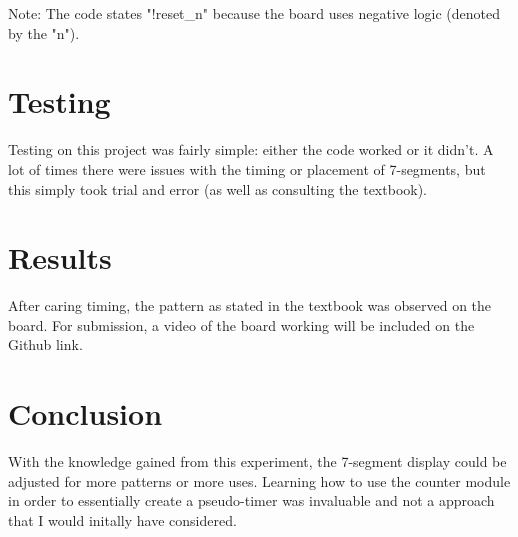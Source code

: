 \documentclass[11pt]{article}
\begin{document}
Note: The code states "!reset\_n" because the board uses negative logic (denoted by the "n"). 

\section*{Testing}

Testing on this project was fairly simple: either the code worked or it didn't. A lot of times there were issues with the timing or placement of 7-segments, but this simply took trial and error (as well as consulting the textbook). 

\section*{Results}

After caring timing, the pattern as stated in the textbook was observed on the board. For submission, a video of the board working will be included on the Github link. 

\section*{Conclusion}

With the knowledge gained from this experiment, the 7-segment display could be adjusted for more patterns or more uses. Learning how to use the counter module in order to essentially create a pseudo-timer was invaluable and not a approach that I would initally have considered. 
\end{document}
